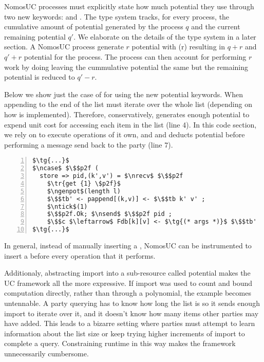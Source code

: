 NomosUC processes must explicitly state how much potential they use through two new keywords: \inline{$\ngenpot$} and \inline{$\ntick$}.
The type system tracks, for every process, the cumulative amount of potential generated by the process $q$ and the current remaining potential $q'$. We elaborate on the details of the type system in a later section.
A NomosUC process generate $r$ potential with \inline{$\ngenpot$}(r) resulting in $q+r$ and $q'+r$ potential for the process. 
The process can then account for performing $r$ work by doing  leaving the cummulative potential the same but the remaining potential is reduced to $q'-r$.

Below we show just the case of  for \Fdb using the new potential keywords. 
When appending to the end of the list \Fdb must iterate over the whole list (depending on how  is implemented).
Therefore, conservatively, \Fdb generates enough potential to expend unit cost for accessing each item in the list (line 4).
In this code section, we rely on  to execute \inline{$\ntick$} operations of it own, and \Fdb and deducts potential before performing a message send back to the party (line 7).
\begin{lstlisting}[basicstyle=\scriptsize\BeraMonottFamily, frame=single, mathescape, numbers=left, xleftmargin=2em, xrightmargin=2em]
$\tg{...}$
$\ncase$ $\$$p2f (
  store => pid,(k',v') = $\nrecv$ $\$$p2f
    $\tr{get {1} \$p2f}$
    $\ngenpot$(length l)
    $\$$tb' <- pappend[(k,v)] <- $\$$tb k' v' ;
    $\ntick$(1)
    $\$$p2f.Ok; $\nsend$ $\$$p2f pid ;
    $\$$c $\leftarrow$ Fdb[k][v] <- $\tg{(* args *)}$ $\$$tb'
$\tg{...}$
\end{lstlisting}
In general, instead of manually inserting a \itick, NomosUC can be instrumented to insert a \itick before every operation that it performs. 

Additionaly, abstracting import into a sub-resource called potential makes the UC framework all the more expressive.
If import was used to count and bound computation directly, rather than through a polynomial, the \Fdb example becomes untennable. 
A party querying \Fdb has to know how long the list is so it sends enough import to iterate over it, and it doesn't know how many items other parties may have added.
This leads to a bizarre setting where parties must attempt to learn information about the list size or keep trying higher increments of import to complete a query.
Constraining runtime in this way makes the framework unnecessarily cumbersome.

